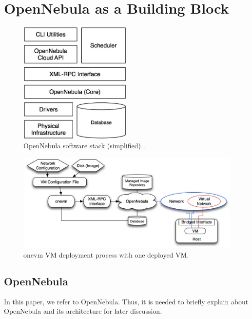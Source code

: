 \documentclass[conference]{IEEEtran}
\begin{document}

\section{OpenNebula as a Building Block}

\begin{figure}[!t]
\centering
\includegraphics[width=2.2in]{onearch}
\caption{OpenNebula software stack (simplified) \cite{introapis}.}
\label{fig:onearch}
\end{figure}

\begin{figure}[!t]
\centering
\includegraphics[width=6.5in]{onevm}
\caption{onevm VM deployment process with one deployed VM.}
\label{fig:onevm}
\end{figure}

\subsection{OpenNebula}
In this paper, we refer to OpenNebula. Thus, it is needed to briefly explain about OpenNebula and its architecture for later discussion.
\end{document}
